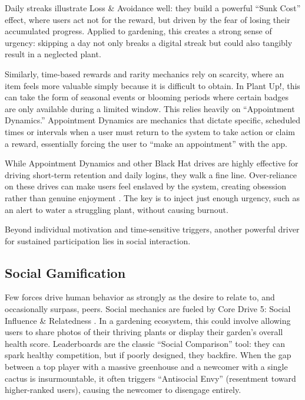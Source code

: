 Daily streaks illustrate Loss \& Avoidance well: they build a powerful ``Sunk Cost'' effect, where users act not for the reward, but driven by the fear of losing their accumulated progress. Applied to gardening, this creates a strong sense of urgency: skipping a day not only breaks a digital streak but could also tangibly result in a neglected plant.

Similarly, time-based rewards and rarity mechanics rely on scarcity, where an item feels more valuable simply because it is difficult to obtain. In Plant Up!, this can take the form of seasonal events or blooming periods where certain badges are only available during a limited window. This relies heavily on ``Appointment Dynamics.'' Appointment Dynamics are mechanics that dictate specific, scheduled times or intervals when a user must return to the system to take action or claim a reward, essentially forcing the user to ``make an appointment'' with the app. 

While Appointment Dynamics and other Black Hat drives are highly effective for driving short-term retention and daily logins, they walk a fine line. Over-reliance on these drives can make users feel enslaved by the system, creating obsession rather than genuine enjoyment \cite{chouGamification2015}. The key is to inject just enough urgency, such as an alert to water a struggling plant, without causing burnout.

Beyond individual motivation and time-sensitive triggers, another powerful driver for sustained participation lies in social interaction.

\subsection{Social Gamification}

Few forces drive human behavior as strongly as the desire to relate to, and occasionally surpass, peers. Social mechanics are fueled by Core Drive 5: Social Influence \& Relatedness \cite{chouGamification2015}. In a gardening ecosystem, this could involve allowing users to share photos of their thriving plants or display their garden's overall health score. Leaderboards are the classic ``Social Comparison'' tool: they can spark healthy competition, but if poorly designed, they backfire. When the gap between a top player with a massive greenhouse and a newcomer with a single cactus is insurmountable, it often triggers ``Antisocial Envy'' (resentment toward higher-ranked users), causing the newcomer to disengage entirely.

